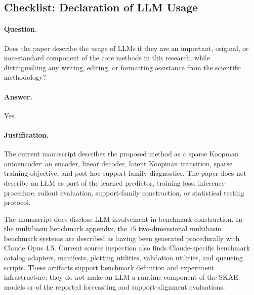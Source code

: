 \subsection{Checklist: Declaration of LLM Usage}
\label{app:checklist_llm_usage}

\paragraph{Question.}
Does the paper describe the usage of LLMs if they are an important, original,
or non-standard component of the core methods in this research, while
distinguishing any writing, editing, or formatting assistance from the
scientific methodology?

\paragraph{Answer.}
Yes.

\paragraph{Justification.}
The current manuscript describes the proposed method as a sparse Koopman
autoencoder: an encoder, linear decoder, latent Koopman transition, sparse
training objective, and post-hoc support-family diagnostics. The paper does not
describe an LLM as part of the learned predictor, training loss, inference
procedure, rollout evaluation, support-family construction, or statistical
testing protocol.

The manuscript does disclose LLM involvement in benchmark construction. In the
multibasin benchmark appendix, the \(15\) two-dimensional multibasin benchmark
systems are described as having been generated procedurally with Claude Opus
4.5. Current source inspection also finds Claude-specific benchmark catalog
adapters, manifests, plotting utilities, validation utilities, and queueing
scripts. These artifacts support benchmark definition and experiment
infrastructure; they do not make an LLM a runtime component of the SKAE models
or of the reported forecasting and support-alignment evaluations.

